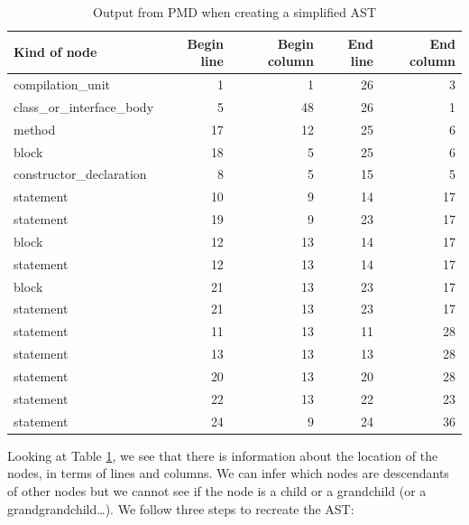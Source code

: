 \documentclass[
]{article}
\begin{document}
\begin{table}[!h]

\caption{\label{tab:unnamed-chunk-2}Output from PMD when creating a simplified AST\label{tab_nodes}}
\centering
\begin{tabular}[t]{l|r|r|r|r}
\hline
Kind of node & Begin line & Begin column & End line & End column\\
\hline
\rowcolor{gray!6}  compilation\_unit & 1 & 1 & 26 & 3\\
\hline
class\_or\_interface\_body & 5 & 48 & 26 & 1\\
\hline
\rowcolor{gray!6}  method & 17 & 12 & 25 & 6\\
\hline
block & 18 & 5 & 25 & 6\\
\hline
\rowcolor{gray!6}  constructor\_declaration & 8 & 5 & 15 & 5\\
\hline
statement & 10 & 9 & 14 & 17\\
\hline
\rowcolor{gray!6}  statement & 19 & 9 & 23 & 17\\
\hline
block & 12 & 13 & 14 & 17\\
\hline
\rowcolor{gray!6}  statement & 12 & 13 & 14 & 17\\
\hline
block & 21 & 13 & 23 & 17\\
\hline
\rowcolor{gray!6}  statement & 21 & 13 & 23 & 17\\
\hline
statement & 11 & 13 & 11 & 28\\
\hline
\rowcolor{gray!6}  statement & 13 & 13 & 13 & 28\\
\hline
statement & 20 & 13 & 20 & 28\\
\hline
\rowcolor{gray!6}  statement & 22 & 13 & 22 & 23\\
\hline
statement & 24 & 9 & 24 & 36\\
\hline
\end{tabular}
\end{table}

\normalsize

Looking at Table \ref{tab_nodes}, we see that there is information about
the location of the nodes, in terms of lines and columns. We can infer
which nodes are descendants of other nodes but we cannot see if the node
is a child or a grandchild (or a grandgrandchild\ldots). We follow three
steps to recreate the AST:
\end{document}

